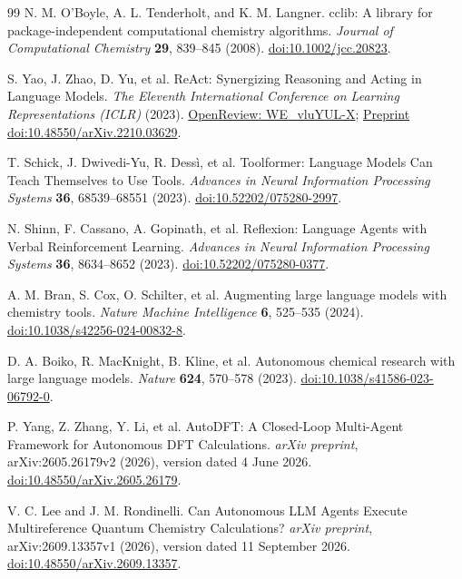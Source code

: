 \begin{thebibliography}{99}
  N. M. O'Boyle, A. L. Tenderholt, and K. M. Langner.
  cclib: A library for package-independent computational chemistry algorithms.
  \emph{Journal of Computational Chemistry} \textbf{29}, 839--845 (2008).
  \href{https://doi.org/10.1002/jcc.20823}{doi:10.1002/jcc.20823}.

  S. Yao, J. Zhao, D. Yu, et al.
  ReAct: Synergizing Reasoning and Acting in Language Models.
  \emph{The Eleventh International Conference on Learning Representations (ICLR)} (2023).
  \href{https://openreview.net/forum?id=WE_vluYUL-X}{OpenReview: WE\_vluYUL-X};
  \href{https://doi.org/10.48550/arXiv.2210.03629}{Preprint doi:10.48550/arXiv.2210.03629}.

  T. Schick, J. Dwivedi-Yu, R. Dessì, et al.
  Toolformer: Language Models Can Teach Themselves to Use Tools.
  \emph{Advances in Neural Information Processing Systems} \textbf{36}, 68539--68551 (2023).
  \href{https://doi.org/10.52202/075280-2997}{doi:10.52202/075280-2997}.

  N. Shinn, F. Cassano, A. Gopinath, et al.
  Reflexion: Language Agents with Verbal Reinforcement Learning.
  \emph{Advances in Neural Information Processing Systems} \textbf{36}, 8634--8652 (2023).
  \href{https://doi.org/10.52202/075280-0377}{doi:10.52202/075280-0377}.

  A. M. Bran, S. Cox, O. Schilter, et al.
  Augmenting large language models with chemistry tools.
  \emph{Nature Machine Intelligence} \textbf{6}, 525--535 (2024).
  \href{https://doi.org/10.1038/s42256-024-00832-8}{doi:10.1038/s42256-024-00832-8}.

  D. A. Boiko, R. MacKnight, B. Kline, et al.
  Autonomous chemical research with large language models.
  \emph{Nature} \textbf{624}, 570--578 (2023).
  \href{https://doi.org/10.1038/s41586-023-06792-0}{doi:10.1038/s41586-023-06792-0}.

  P. Yang, Z. Zhang, Y. Li, et al.
  AutoDFT: A Closed-Loop Multi-Agent Framework for Autonomous DFT Calculations.
  \emph{arXiv preprint}, arXiv:2605.26179v2 (2026), version dated 4 June 2026.
  \href{https://doi.org/10.48550/arXiv.2605.26179}{doi:10.48550/arXiv.2605.26179}.

  V. C. Lee and J. M. Rondinelli.
  Can Autonomous LLM Agents Execute Multireference Quantum Chemistry Calculations?
  \emph{arXiv preprint}, arXiv:2609.13357v1 (2026), version dated 11 September 2026.
  \href{https://doi.org/10.48550/arXiv.2609.13357}{doi:10.48550/arXiv.2609.13357}.


\end{thebibliography}
